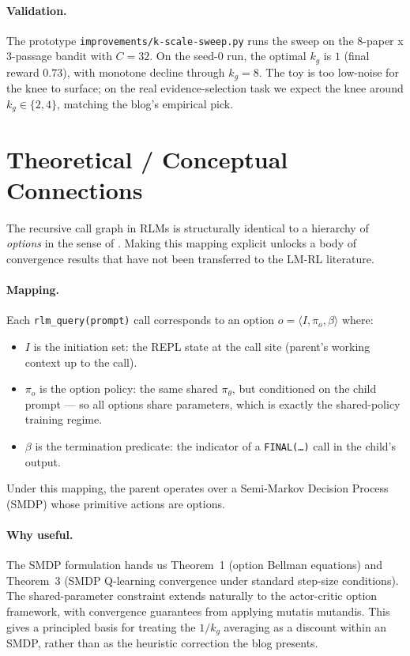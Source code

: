 \documentclass[11pt]{article}
\begin{document}
\paragraph{Validation.} The prototype \texttt{improvements/k-scale-sweep.py}
runs the sweep on the 8-paper x 3-passage bandit with $C = 32$. On the
seed-0 run, the optimal $k_g$ is $1$ (final reward $0.73$), with monotone
decline through $k_g = 8$. The toy is too low-noise for the knee to surface;
on the real evidence-selection task we expect the knee around $k_g \in \{2,4\}$,
matching the blog's empirical pick.

\section*{Theoretical / Conceptual Connections}

The recursive call graph in RLMs is structurally identical to a hierarchy of
\emph{options} in the sense of \citet{sutton1999options}. Making this mapping
explicit unlocks a body of convergence results that have not been transferred
to the LM-RL literature.

\paragraph{Mapping.} Each \texttt{rlm\_query(prompt)} call corresponds to an
option $o = \langle I, \pi_o, \beta\rangle$ where:
\begin{itemize}[leftmargin=2em,itemsep=0pt]
  \item $I$ is the initiation set: the REPL state at the call site
        (parent's working context up to the call).
  \item $\pi_o$ is the option policy: the same shared $\pi_\theta$, but
        conditioned on the child prompt — so all options share parameters,
        which is exactly the shared-policy training regime.
  \item $\beta$ is the termination predicate: the indicator of a
        \texttt{FINAL(\dots)} call in the child's output.
\end{itemize}
Under this mapping, the parent operates over a Semi-Markov Decision Process
(SMDP) whose primitive actions are options.

\paragraph{Why useful.} The SMDP formulation hands us
\citet{sutton1999options} Theorem~1 (option Bellman equations) and Theorem~3
(SMDP Q-learning convergence under standard step-size conditions). The
shared-parameter constraint extends naturally to the actor-critic option
framework, with convergence guarantees from \citet{precup2000eligibility}
applying mutatis mutandis. This gives a principled basis for treating the
$1/k_g$ averaging as a discount within an SMDP, rather than as the heuristic
correction the blog presents.
\end{document}
